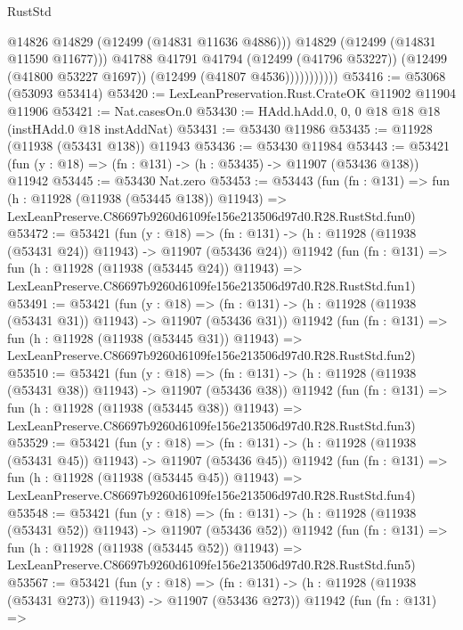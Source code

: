 \begin{lexlean}{RustStd}
\begin{coremodule}
                          @14826
                          @14829
                          (@12499 (@14831 @11636 @4886)))
                        @14829
                        (@12499 (@14831 @11590 @11677)))
                      @41788
                      @41791
                      @41794
                      (@12499 (@41796 @53227))
                      (@12499 (@41800 @53227 @1697))
                      (@12499 (@41807 @4536)))))))))))
@53416 := @53068 (@53093 @53414)
@53420 := LexLeanPreservation.Rust.CrateOK @11902 @11904 @11906
@53421 := Nat.casesOn.{0}
@53430 := HAdd.hAdd.{0, 0, 0} @18 @18 @18 (instHAdd.{0} @18 instAddNat)
@53431 := @53430 @11986
@53435 := @11928 (@11938 (@53431 @138)) @11943
@53436 := @53430 @11984
@53443 := @53421 (fun (y : @18) => (fn : @131) -> (h : @53435) -> @11907 (@53436 @138)) @11942
@53445 := @53430 Nat.zero
@53453 := @53443
    (fun (fn : @131) =>
    fun (h : @11928 (@11938 (@53445 @138)) @11943) =>
    LexLeanPreserve.C86697b9260d6109fe156e213506d97d0.R28.RustStd.fun0)
@53472 := @53421
    (fun (y : @18) =>
    (fn : @131) -> (h : @11928 (@11938 (@53431 @24)) @11943) -> @11907 (@53436 @24))
    @11942
    (fun (fn : @131) =>
    fun (h : @11928 (@11938 (@53445 @24)) @11943) =>
    LexLeanPreserve.C86697b9260d6109fe156e213506d97d0.R28.RustStd.fun1)
@53491 := @53421
    (fun (y : @18) =>
    (fn : @131) -> (h : @11928 (@11938 (@53431 @31)) @11943) -> @11907 (@53436 @31))
    @11942
    (fun (fn : @131) =>
    fun (h : @11928 (@11938 (@53445 @31)) @11943) =>
    LexLeanPreserve.C86697b9260d6109fe156e213506d97d0.R28.RustStd.fun2)
@53510 := @53421
    (fun (y : @18) =>
    (fn : @131) -> (h : @11928 (@11938 (@53431 @38)) @11943) -> @11907 (@53436 @38))
    @11942
    (fun (fn : @131) =>
    fun (h : @11928 (@11938 (@53445 @38)) @11943) =>
    LexLeanPreserve.C86697b9260d6109fe156e213506d97d0.R28.RustStd.fun3)
@53529 := @53421
    (fun (y : @18) =>
    (fn : @131) -> (h : @11928 (@11938 (@53431 @45)) @11943) -> @11907 (@53436 @45))
    @11942
    (fun (fn : @131) =>
    fun (h : @11928 (@11938 (@53445 @45)) @11943) =>
    LexLeanPreserve.C86697b9260d6109fe156e213506d97d0.R28.RustStd.fun4)
@53548 := @53421
    (fun (y : @18) =>
    (fn : @131) -> (h : @11928 (@11938 (@53431 @52)) @11943) -> @11907 (@53436 @52))
    @11942
    (fun (fn : @131) =>
    fun (h : @11928 (@11938 (@53445 @52)) @11943) =>
    LexLeanPreserve.C86697b9260d6109fe156e213506d97d0.R28.RustStd.fun5)
@53567 := @53421
    (fun (y : @18) =>
    (fn : @131) -> (h : @11928 (@11938 (@53431 @273)) @11943) -> @11907 (@53436 @273))
    @11942
    (fun (fn : @131) =>

\end{coremodule}
\end{lexlean}
